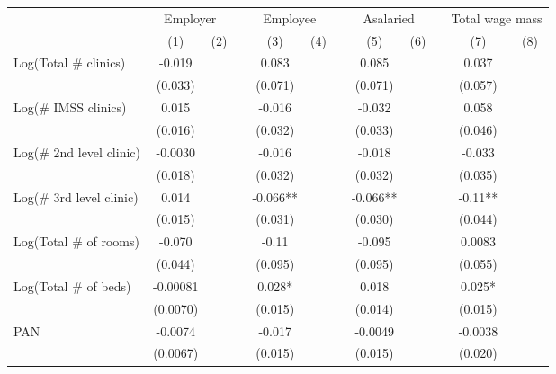 \begin{tabular}{lccccccccccc}
\toprule
      & \multicolumn{2}{c}{Employer} &       & \multicolumn{2}{c}{Employee} &       & \multicolumn{2}{c}{Asalaried} &       & \multicolumn{2}{c}{Total wage mass} \\
\cmidrule{2-3}\cmidrule{5-6}\cmidrule{8-9}\cmidrule{11-12}      & (1)   & (2)   &       & (3)   & (4)   &       & (5)   & (6)   &       & (7)   & (8) \\
\midrule
\midrule
Log(Total \# clinics) & -0.019 &       &       & 0.083 &       &       & 0.085 &       &       & 0.037 &  \\
      & (0.033) &       &       & (0.071) &       &       & (0.071) &       &       & (0.057) &  \\
Log(\# IMSS clinics) & 0.015 &       &       & -0.016 &       &       & -0.032 &       &       & 0.058 &  \\
      & (0.016) &       &       & (0.032) &       &       & (0.033) &       &       & (0.046) &  \\
Log(\# 2nd level clinic) & -0.0030 &       &       & -0.016 &       &       & -0.018 &       &       & -0.033 &  \\
      & (0.018) &       &       & (0.032) &       &       & (0.032) &       &       & (0.035) &  \\
Log(\# 3rd level clinic) & 0.014 &       &       & -0.066** &       &       & -0.066** &       &       & -0.11** &  \\
      & (0.015) &       &       & (0.031) &       &       & (0.030) &       &       & (0.044) &  \\
Log(Total \# of rooms) & -0.070 &       &       & -0.11 &       &       & -0.095 &       &       & 0.0083 &  \\
      & (0.044) &       &       & (0.095) &       &       & (0.095) &       &       & (0.055) &  \\
Log(Total \# of beds) & -0.00081 &       &       & 0.028* &       &       & 0.018 &       &       & 0.025* &  \\
      & (0.0070) &       &       & (0.015) &       &       & (0.014) &       &       & (0.015) &  \\
PAN   & -0.0074 &       &       & -0.017 &       &       & -0.0049 &       &       & -0.0038 &  \\
      & (0.0067) &       &       & (0.015) &       &       & (0.015) &       &       & (0.020) &  \\

\end{tabular}

